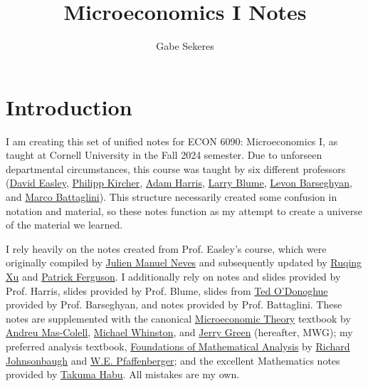 \documentclass[12pt]{article}
\title{Microeconomics I Notes}
\author{Gabe Sekeres}
\begin{document}
\maketitle

\section*{Introduction}

I am creating this set of unified notes for ECON 6090: Microeconomics I, as taught at Cornell University in the Fall 2024 semester. Due to unforseen departmental circumstances, this course was taught by six different professors (\href{https://easley.economics.cornell.edu/}{David Easley}, \href{https://philippkircher.com/}{Philipp Kircher}, \href{https://adamharris.phd/}{Adam Harris}, \href{https://sites.santafe.edu/~leb/}{Larry Blume}, \href{https://barseghyan.economics.cornell.edu/}{Levon Barseghyan}, and \href{https://www.mbattaglini.com/}{Marco Battaglini}). This structure necessarily created some confusion in notation and material, so these notes function as my attempt to create a universe of the material we learned.

I rely heavily on the notes created from Prof. Easley's course, which were originally compiled by \href{https://julienneves.com/}{Julien Manuel Neves} and subsequently updated by \href{https://ruqing-xu.github.io/}{Ruqing Xu} and \href{https://economics.cornell.edu/patrick-ferguson}{Patrick Ferguson}. I additionally rely on notes and slides provided by Prof. Harris, slides provided by Prof. Blume, slides from \href{https://blogs.cornell.edu/odonoghue/}{Ted O'Donoghue} provided by Prof. Barseghyan, and notes provided by Prof. Battaglini. These notes are supplemented with the canonical \href{https://global.oup.com/academic/product/microeconomic-theory-9780195073409?cc=us&lang=en&}{Microeconomic Theory} textbook by \href{https://www.upf.edu/web/andreu-mas-colell}{Andreu Mas-Colell}, \href{https://mitsloan.mit.edu/faculty/directory/michael-whinston}{Michael Whinston}, and \href{https://www.hbs.edu/faculty/Pages/profile.aspx?facId=6466}{Jerry Green} (hereafter, MWG); my preferred analysis textbook, \href{https://store.doverpublications.com/products/9780486477664}{Foundations of Mathematical Analysis} by \href{https://condor.depaul.edu/~rjohnson/}{Richard Johnsonbaugh} and \href{https://www.mathgenealogy.org/id.php?id=12494}{W.E. Pfaffenberger}; and the excellent Mathematics notes provided by \href{https://www.takumahabu.com/Economics}{Takuma Habu}. All mistakes are my own.
\end{document}
